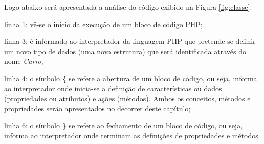\FloatBarrier 	%

Logo abaixo será apresentada a análise do código exibido na
Figura \ref{fig:classe}:

\begin{alineas}
    \item linha 1: vê-se o início da execução de um bloco de código
    PHP;
    \item linha 3: é informado ao interpretador da linguagem \acs{PHP} que
    pretende-se definir um novo tipo de dados (uma nova estrutura) que será
    identificada através do nome \textit{Carro};
    \item linha 4: o símbolo \textbf{\{} se refere a abertura de um
    bloco de código, ou seja, informa ao interpretador onde inicia-se a definição de
    características ou dados (propriedades ou atributos) e ações (métodos).
    Ambos os conceitos, métodos e propriedades serão apresentados no decorrer
    deste capítulo;
    \item linha 6: o símbolo \textbf{\}} se refere ao fechamento de um
    bloco de código, ou seja, informa ao interpretador onde terminam as
    definições de propriedades e métodos.
\end{alineas}